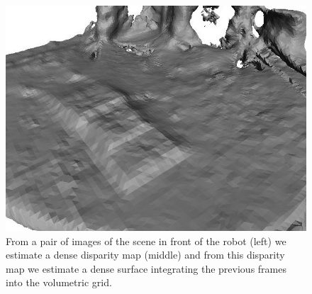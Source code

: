 \begin{figure}[h]
\vspace{0.2cm}
\includegraphics[scale=0.5]{Chap6-3D-Reconstruction/snapshot02}
\caption[]{From a pair of images of the scene in front of the robot
(left) we estimate a dense disparity map (middle) and from this
disparity map we estimate a dense surface integrating the previous
frames into the volumetric grid.}
\label{Fig:Reconstruction1}
\end{figure}


